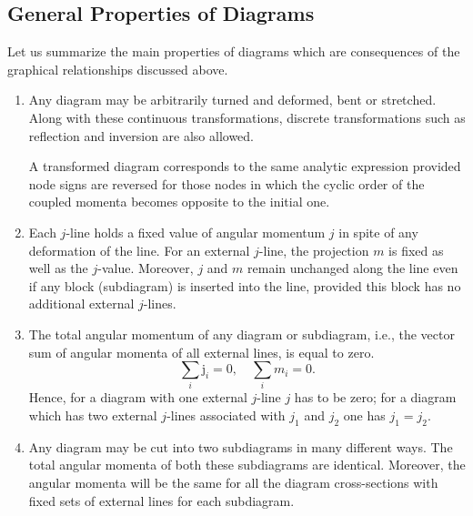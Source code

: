 \subsection{General Properties of Diagrams}\label{sec:11.4.1}
Let us summarize the main properties of diagrams which are consequences of the graphical relationships discussed above.
\begin{enumerate}
\item Any diagram may be arbitrarily turned and deformed, bent or stretched. Along with these continuous transformations, discrete transformations such as reflection and inversion are also allowed.

A transformed diagram corresponds to the same analytic expression provided node signs are reversed for those nodes in which the cyclic order of the coupled momenta becomes opposite to the initial one.
\item Each \(j\)-line holds a fixed value of angular momentum \(j\) in spite of any deformation of the line. For an external \(j\)-line, the projection \(m\) is fixed as well as the \(j\)-value. Moreover, \(j\) and \(m\) remain unchanged along the line even if any block (subdiagram) is inserted into the line, provided this block has no additional external \(j\)-lines.
\item The total angular momentum of any diagram or subdiagram, i.e., the vector sum of angular momenta of all external lines, is equal to zero.
\begin{equation}
\sum_{i} \mathrm{j}_{i}=0, \quad \sum_{i} m_{i}=0 .
\end{equation}
Hence, for a diagram with one external \(j\)-line \(j\) has to be zero; for a diagram which has two external \(j\)-lines associated with \(j_{1}\) and \(j_{2}\) one has \(j_{1}=j_{2}\).
\item Any diagram may be cut into two subdiagrams in many different ways. The total angular momenta of both these subdiagrams are identical. Moreover, the angular momenta will be the same for all the diagram cross-sections with fixed sets of external lines for each subdiagram.
\end{enumerate}

